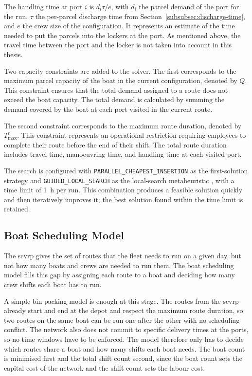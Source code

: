 \documentclass[12pt]{article}
\begin{document}
The handling time at port \(i\) is \(d_i \tau / e\), with \(d_i\) the parcel demand of the port for the run, \(\tau\) the per-parcel discharge time from Section~\ref{subsubsec:discharge-time}, and \(e\) the crew size of the configuration. It represents an estimate of the time needed to put the parcels into the lockers at the port. As mentioned above, the travel time between the port and the locker is not taken into account in this thesis.

Two capacity constraints are added to the solver. The first corresponds to the maximum parcel capacity of the boat in the current configuration, denoted by \(Q\). This constraint ensures that the total demand assigned to a route does not exceed the boat capacity. The total demand is calculated by summing the demand covered by the boat at each port visited in the current route.

The second constraint corresponds to the maximum route duration, denoted by \(T^{r}_{\max}\). This constraint represents an operational restriction requiring employees to complete their route before the end of their shift. The total route duration includes travel time, manoeuvring time, and handling time at each visited port.

The search is configured with \texttt{PARALLEL\_CHEAPEST\_INSERTION} as the first-solution strategy and \texttt{GUIDED\_LOCAL\_SEARCH} as the local-search metaheuristic \parencite{ortools_routing}, with a time limit of \qty{1}{\hour} per run. This combination produces a feasible solution quickly and then iteratively improves it; the best solution found within the time limit is retained.

\subsection{Boat Scheduling Model}
\label{subsubsec:boat-scheduling-optimization-model}

The \ac{scvrp} gives the set of routes that the fleet needs to run on a given day, but not how many boats and crews are needed to run them. The boat scheduling model fills this gap by assigning each route to a boat and deciding how many crew shifts each boat has to run.

A simple bin packing model is enough at this stage. The routes from the \ac{scvrp} already start and end at the depot and respect the maximum route duration, so two routes on the same boat can be run one after the other with no scheduling conflict. The network also does not commit to specific delivery times at the ports, so no time windows have to be enforced. The model therefore only has to decide which routes share a boat and how many shifts each boat needs. The boat count is minimised first and the total shift count second, since the boat count sets the capital cost of the network and the shift count sets the labour cost.
\end{document}
